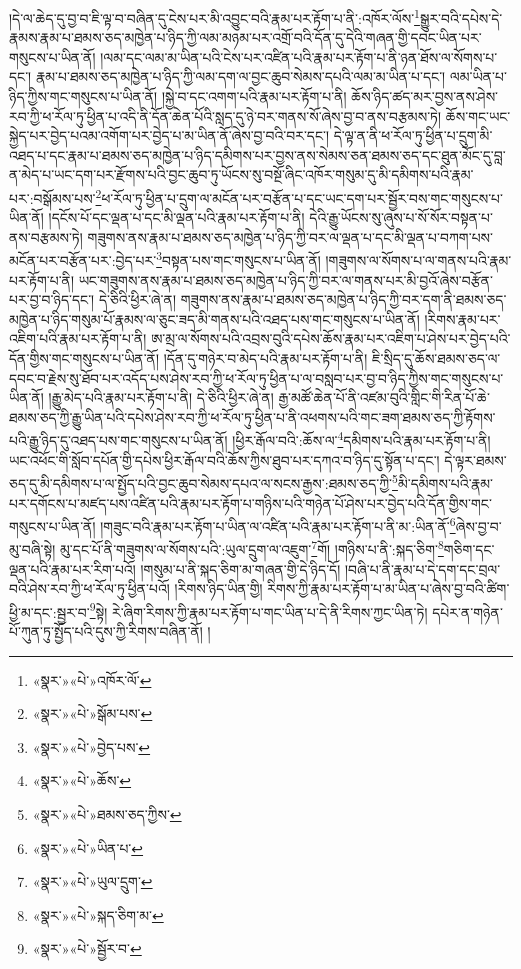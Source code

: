 །དེ་ལ་ཆེད་དུ་བྱ་བ་ཇི་ལྟ་བ་བཞིན་དུ་ངེས་པར་མི་འབྱུང་བའི་རྣམ་པར་རྟོག་པ་ནི་:འཁོར་ལོས་\footnote{«སྣར་»«པེ་»འཁོར་ལོ་}སྒྱུར་བའི་དཔེས་དེ་རྣམས་རྣམ་པ་ཐམས་ཅད་མཁྱེན་པ་ཉིད་ཀྱི་ལམ་མཉམ་པར་འགྲོ་བའི་དོན་དུ་དེའི་གཞན་གྱི་དབང་ཡིན་པར་གསུངས་པ་ཡིན་ནོ། །ལམ་དང་ལམ་མ་ཡིན་པའི་ངེས་པར་འཛིན་པའི་རྣམ་པར་རྟོག་པ་ནི་ཉན་ཐོས་ལ་སོགས་པ་དང་། རྣམ་པ་ཐམས་ཅད་མཁྱེན་པ་ཉིད་ཀྱི་ལམ་དག་ལ་བྱང་ཆུབ་སེམས་དཔའི་ལམ་མ་ཡིན་པ་དང་། ལམ་ཡིན་པ་ཉིད་ཀྱིས་གང་གསུངས་པ་ཡིན་ནོ། །སྐྱེ་བ་དང་འགག་པའི་རྣམ་པར་རྟོག་པ་ནི། ཆོས་ཉིད་ཚད་མར་བྱས་ནས་ཤེས་རབ་ཀྱི་ཕ་རོལ་ཏུ་ཕྱིན་པ་འདི་ནི་དོན་ཆེན་པོའི་སླད་དུ་ཉེ་བར་གནས་སོ་ཞེས་བྱ་བ་ནས་བརྩམས་ཏེ། ཆོས་གང་ཡང་སྐྱེད་པར་བྱེད་པའམ་འགོག་པར་བྱེད་པ་མ་ཡིན་ནོ་ཞེས་བྱ་བའི་བར་དང་། དེ་ལྟ་ན་ནི་ཕ་རོལ་ཏུ་ཕྱིན་པ་དྲུག་མི་འཐད་པ་དང་རྣམ་པ་ཐམས་ཅད་མཁྱེན་པ་ཉིད་དམིགས་པར་བྱས་ནས་སེམས་ཅན་ཐམས་ཅད་དང་ཐུན་མོང་དུ་བླ་ན་མེད་པ་ཡང་དག་པར་རྫོགས་པའི་བྱང་ཆུབ་ཏུ་ཡོངས་སུ་བསྔོ་ཞིང་འཁོར་གསུམ་དུ་མི་དམིགས་པའི་རྣམ་པར་:བསྒོམས་པས་\footnote{«སྣར་»«པེ་»སྒོམ་པས་}ཕ་རོལ་ཏུ་ཕྱིན་པ་དྲུག་ལ་མངོན་པར་བརྩོན་པ་དང་ཡང་དག་པར་སྦྱོར་བས་གང་གསུངས་པ་ཡིན་ནོ། །དངོས་པོ་དང་ལྡན་པ་དང་མི་ལྡན་པའི་རྣམ་པར་རྟོག་པ་ནི། དེའི་རྒྱུ་ཡོངས་སུ་ཞུས་པ་སོ་སོར་བསྟན་པ་ནས་བརྩམས་ཏེ། གཟུགས་ནས་རྣམ་པ་ཐམས་ཅད་མཁྱེན་པ་ཉིད་ཀྱི་བར་ལ་ལྡན་པ་དང་མི་ལྡན་པ་བཀག་པས་མངོན་པར་བརྩོན་པར་:བྱེད་པར་\footnote{«སྣར་»«པེ་»བྱེད་པས་}བསྟན་པས་གང་གསུངས་པ་ཡིན་ནོ། །གཟུགས་ལ་སོགས་པ་ལ་གནས་པའི་རྣམ་པར་རྟོག་པ་ནི། ཡང་གཟུགས་ནས་རྣམ་པ་ཐམས་ཅད་མཁྱེན་པ་ཉིད་ཀྱི་བར་ལ་གནས་པར་མི་བྱའོ་ཞེས་བརྩོན་པར་བྱ་བ་ཉིད་དང་། དེ་ཅིའི་ཕྱིར་ཞེ་ན། གཟུགས་ནས་རྣམ་པ་ཐམས་ཅད་མཁྱེན་པ་ཉིད་ཀྱི་བར་དག་ནི་ཐམས་ཅད་མཁྱེན་པ་ཉིད་གསུམ་པོ་རྣམས་ལ་ཅུང་ཟད་མི་གནས་པའི་འཐད་པས་གང་གསུངས་པ་ཡིན་ནོ། །རིགས་རྣམ་པར་འཇིག་པའི་རྣམ་པར་རྟོག་པ་ནི། ཨ་མྲ་ལ་སོགས་པའི་འབྲས་བུའི་དཔེས་ཆོས་རྣམ་པར་འཇིག་པ་ཤེས་པར་བྱེད་པའི་དོན་གྱིས་གང་གསུངས་པ་ཡིན་ནོ། །དོན་དུ་གཉེར་བ་མེད་པའི་རྣམ་པར་རྟོག་པ་ནི། ཇི་སྲིད་དུ་ཆོས་ཐམས་ཅད་ལ་དབང་བ་རྗེས་སུ་ཐོབ་པར་འདོད་པས་ཤེས་རབ་ཀྱི་ཕ་རོལ་ཏུ་ཕྱིན་པ་ལ་བསླབ་པར་བྱ་བ་ཉིད་ཀྱིས་གང་གསུངས་པ་ཡིན་ནོ། །རྒྱུ་མེད་པའི་རྣམ་པར་རྟོག་པ་ནི། དེ་ཅིའི་ཕྱིར་ཞེ་ན། རྒྱ་མཚོ་ཆེན་པོ་ནི་འཛམ་བུའི་གླིང་གི་རིན་པོ་ཆེ་ཐམས་ཅད་ཀྱི་རྒྱུ་ཡིན་པའི་དཔེས་ཤེས་རབ་ཀྱི་ཕ་རོལ་ཏུ་ཕྱིན་པ་ནི་འཕགས་པའི་གང་ཟག་ཐམས་ཅད་ཀྱི་རྟོགས་པའི་རྒྱུ་ཉིད་དུ་འཐད་པས་གང་གསུངས་པ་ཡིན་ནོ། །ཕྱིར་རྒོལ་བའི་:ཆོས་ལ་\footnote{«སྣར་»«པེ་»ཆོས་}དམིགས་པའི་རྣམ་པར་རྟོག་པ་ནི། ཡང་འཕོང་གི་སློབ་དཔོན་གྱི་དཔེས་ཕྱིར་རྒོལ་བའི་ཆོས་ཀྱིས་ཐུབ་པར་དཀའ་བ་ཉིད་དུ་སྟོན་པ་དང་། དེ་ལྟར་ཐམས་ཅད་དུ་མི་དམིགས་པ་ལ་སྤྱོད་པའི་བྱང་ཆུབ་སེམས་དཔའ་ལ་སངས་རྒྱས་:ཐམས་ཅད་ཀྱི་\footnote{«སྣར་»«པེ་»ཐམས་ཅད་ཀྱིས་}མི་དམིགས་པའི་རྣམ་པར་དགོངས་པ་མཛད་པས་འཛིན་པའི་རྣམ་པར་རྟོག་པ་གཉིས་པའི་གཉེན་པོ་ཤེས་པར་བྱེད་པའི་དོན་གྱིས་གང་གསུངས་པ་ཡིན་ནོ། །གཟུང་བའི་རྣམ་པར་རྟོག་པ་ཡིན་ལ་འཛིན་པའི་རྣམ་པར་རྟོག་པ་ནི་མ་:ཡིན་ནོ་\footnote{«སྣར་»«པེ་»ཡིན་པ་}ཞེས་བྱ་བ་མུ་བཞི་སྟེ། མུ་དང་པོ་ནི་གཟུགས་ལ་སོགས་པའི་:ཡུལ་དྲུག་ལ་འཇུག་\footnote{«སྣར་»«པེ་»ཡུལ་དྲུག་}གོ། །གཉིས་པ་ནི་:སྐད་ཅིག་\footnote{«སྣར་»«པེ་»སྐད་ཅིག་མ་}གཅིག་དང་ལྡན་པའི་རྣམ་པར་རིག་པའོ། །གསུམ་པ་ནི་སྐད་ཅིག་མ་གཞན་གྱི་དེ་ཉིད་དོ། །བཞི་པ་ནི་རྣམ་པ་དེ་དག་དང་བྲལ་བའི་ཤེས་རབ་ཀྱི་ཕ་རོལ་ཏུ་ཕྱིན་པའོ། །རིགས་ཉིད་ཡིན་གྱི། རིགས་ཀྱི་རྣམ་པར་རྟོག་པ་མ་ཡིན་པ་ཞེས་བྱ་བའི་ཚིག་ཕྱི་མ་དང་:སྦྱར་བ་\footnote{«སྣར་»«པེ་»སྦྱོར་བ་}སྟེ། རེ་ཞིག་རིགས་ཀྱི་རྣམ་པར་རྟོག་པ་གང་ཡིན་པ་དེ་ནི་རིགས་ཀྱང་ཡིན་ཏེ། དཔེར་ན་གཉེན་པོ་ཀུན་ཏུ་སྤྱོད་པའི་དུས་ཀྱི་རིགས་བཞིན་ནོ། །
